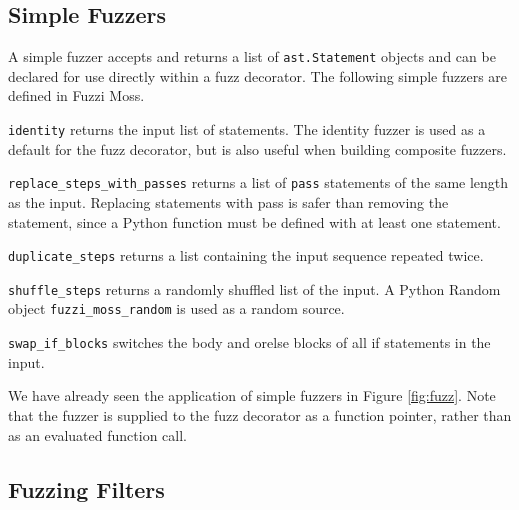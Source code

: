 \documentclass{sig-alternate}
\newenvironment{FunctionList}{%
\lstset{basicstyle=\ttfamily\bfseries\small}
\begin{list}{}{\leftmargin=5pt}
}{\end{list}\lstset{basicstyle=\ttfamily\small}}
\begin{document}

\subsection{Simple Fuzzers}


A simple fuzzer accepts and returns a list of \lstinline!ast.Statement! objects
and can be declared for use directly within a fuzz decorator.  The following
simple fuzzers are defined in Fuzzi Moss.

\begin{FunctionList}

\item\lstinline!identity! returns the input list of statements.  The identity
  fuzzer is used as a default for the fuzz decorator, but is also useful when
  building composite fuzzers.

\item\lstinline!replace_steps_with_passes! returns a list of \lstinline!pass!
  statements of the same length as the input.  Replacing statements with pass is
  safer than removing the statement, since a Python function must be defined
  with at least one statement.

\item\lstinline!duplicate_steps! returns a list containing the input sequence
  repeated twice.

\item\lstinline!shuffle_steps! returns a randomly shuffled list of the input.  A
  Python Random object \lstinline!fuzzi_moss_random! is used as a random source.

\item \lstinline!swap_if_blocks! switches the body and orelse blocks of all if
  statements in the input.

\end{FunctionList}

We have already seen the application of simple fuzzers in Figure \ref{fig:fuzz}.
Note that the fuzzer is supplied to the fuzz decorator as a function pointer,
rather than as an evaluated function call.


\subsection{Fuzzing Filters}
\end{document}
